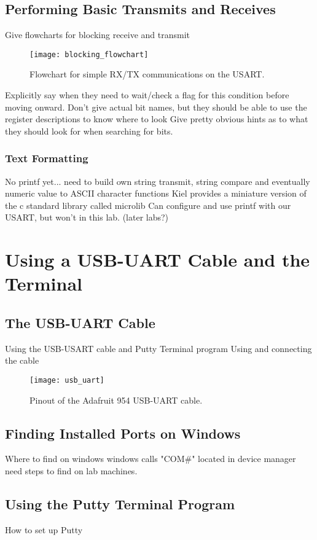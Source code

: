 \documentclass[11pt,fleqn]{book} %
\begin{document}
\subsection{Performing Basic Transmits and Receives}
Give flowcharts for blocking receive and transmit
\begin{figure}[]
    \centering\texttt{[image: blocking\_flowchart]}
    \caption{Flowchart for simple RX/TX communications on the USART.}
    \label{blocking_flowchart}
\end{figure}
Explicitly say when they need to wait/check a flag for this condition before moving onward. 
Don't give actual bit names, but they should be able to use the register descriptions to know where to look
Give pretty obvious hints as to what they should look for when searching for bits.
\subsubsection{Text Formatting}
No printf yet... need to build own string transmit, string compare and eventually numeric value to ASCII character functions
Kiel provides a miniature version of the c standard library called microlib
Can configure and use printf with our USART, but won't in this lab. (later labs?)

\section{Using a USB-UART Cable and the Terminal}
\subsection{The USB-UART Cable}
Using the USB-USART cable and Putty Terminal program
Using and connecting the cable

\begin{figure}[]
    \centering\texttt{[image: usb\_uart]}
    \caption{Pinout of the Adafruit 954 USB-UART cable.}
    \label{usb_uart}
\end{figure}

\subsection{Finding Installed Ports on Windows}
Where to find on windows
windows calls "COM\#" located in device manager
need steps to find on lab machines.




\subsection{Using the Putty Terminal Program}
How to set up Putty
\end{document}
